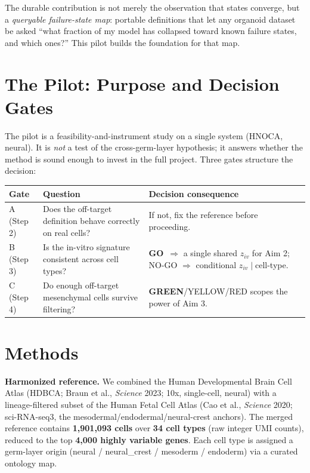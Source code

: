 \documentclass[11pt]{article}
\newcommand{\GO}{\textcolor{nsgreen}{\textbf{GO}}}
\newcommand{\GREEN}{\textcolor{nsgreen}{\textbf{GREEN}}}
\begin{document}
The durable contribution is not merely the observation that states converge, but a \emph{queryable failure-state map}: portable definitions that let any organoid dataset be asked ``what fraction of my model has collapsed toward known failure states, and which ones?'' This pilot builds the foundation for that map.

\section{The Pilot: Purpose and Decision Gates}
The pilot is a feasibility-and-instrument study on a single system (HNOCA, neural). It is \emph{not} a test of the cross-germ-layer hypothesis; it answers whether the method is sound enough to invest in the full project. Three gates structure the decision:

\begin{table}[H]
\centering
\small
\begin{tabular}{@{}p{1.4cm} p{5.6cm} p{6.6cm}@{}}
\toprule
\textbf{Gate} & \textbf{Question} & \textbf{Decision consequence} \\
\midrule
A (Step 2) & Does the off-target definition behave correctly on real cells? & If not, fix the reference before proceeding. \\
B (Step 3) & Is the in-vitro signature consistent across cell types? & \GO\ $\Rightarrow$ a single shared $z_{iv}$ for Aim 2; NO-GO $\Rightarrow$ conditional $z_{iv}\mid$cell-type. \\
C (Step 4) & Do enough off-target mesenchymal cells survive filtering? & \GREEN/YELLOW/RED scopes the power of Aim 3. \\
\bottomrule
\end{tabular}
\end{table}

\section{Methods}
\textbf{Harmonized reference.} We combined the Human Developmental Brain Cell Atlas (HDBCA; Braun et al., \emph{Science} 2023; 10x, single-cell, neural) with a lineage-filtered subset of the Human Fetal Cell Atlas (Cao et al., \emph{Science} 2020; sci-RNA-seq3, the mesodermal/endodermal/neural-crest anchors). The merged reference contains \textbf{1{,}901{,}093 cells} over \textbf{34 cell types} (raw integer UMI counts), reduced to the top \textbf{4{,}000 highly variable genes}. Each cell type is assigned a germ-layer origin (neural / neural\_crest / mesoderm / endoderm) via a curated ontology map.
\end{document}
